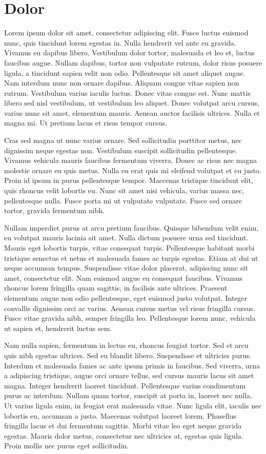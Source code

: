 \chapter{Dolor}

Lorem ipsum dolor sit amet, consectetur adipiscing elit. Fusce luctus
euismod nunc, quis tincidunt lorem egestas in. Nulla hendrerit vel
ante eu gravida. Vivamus eu dapibus libero. Vestibulum dolor tortor,
malesuada et leo et, luctus faucibus augue. Nullam dapibus, tortor non
vulputate rutrum, dolor risus posuere ligula, a tincidunt sapien velit
non odio. Pellentesque sit amet aliquet augue. Nam interdum nunc non
ornare dapibus. Aliquam congue vitae sapien non rutrum. Vestibulum
varius iaculis luctus. Donec vitae congue est. Nunc mattis libero sed
nisl vestibulum, ut vestibulum leo aliquet. Donec volutpat arcu
cursus, varius nunc sit amet, elementum mauris. Aenean auctor
facilisis ultrices. Nulla et magna mi. Ut pretium lacus et risus
tempor cursus.

 Cras sed magna ut nunc varius ornare. Sed sollicitudin porttitor
 metus, nec dignissim neque egestas non. Vestibulum suscipit
 sollicitudin pellentesque. Vivamus vehicula mauris faucibus fermentum
 viverra. Donec ac risus nec magna molestie ornare eu quis metus.
 Nulla eu erat quis mi eleifend volutpat et eu justo. Proin id ipsum
 in purus pellentesque tempor. Maecenas tristique tincidunt elit, quis
 rhoncus velit lobortis eu. Nunc sit amet nisi vehicula, varius massa
 nec, pellentesque nulla. Fusce porta mi ut vulputate vulputate. Fusce
 sed ornare tortor, gravida fermentum nibh.

Nullam imperdiet purus at arcu pretium faucibus. Quisque bibendum
velit enim, eu volutpat mauris lacinia sit amet. Nulla dictum posuere
urna sed tincidunt. Mauris eget lobortis turpis, vitae consequat
turpis. Pellentesque habitant morbi tristique senectus et netus et
malesuada fames ac turpis egestas. Etiam at dui ut neque accumsan
tempus. Suspendisse vitae dolor placerat, adipiscing nunc sit amet,
consectetur elit. Nam euismod augue eu consequat faucibus. Vivamus
rhoncus lorem fringilla quam sagittis, in facilisis ante ultrices.
Praesent elementum augue non odio pellentesque, eget euismod justo
volutpat. Integer convallis dignissim orci ac varius. Aenean cursus
metus vel risus fringilla cursus. Fusce vitae gravida nibh, semper
fringilla leo. Pellentesque lorem nunc, vehicula ut sapien et,
hendrerit luctus sem.

Nam nulla sapien, fermentum in lectus eu, rhoncus feugiat tortor. Sed
et arcu quis nibh egestas ultrices. Sed eu blandit libero. Suspendisse
et ultricies purus. Interdum et malesuada fames ac ante ipsum primis
in faucibus. Sed viverra, urna a adipiscing tristique, augue orci
ornare tellus, sed cursus mauris lacus sit amet magna. Integer
hendrerit laoreet tincidunt. Pellentesque varius condimentum purus ac
interdum. Nullam quam tortor, suscipit at porta in, laoreet nec nulla.
Ut varius ligula enim, in feugiat erat malesuada vitae. Nunc ligula
elit, iaculis nec lobortis eu, accumsan a justo. Maecenas volutpat
laoreet lorem. Phasellus fringilla lacus et dui fermentum sagittis.
Morbi vitae leo eget neque gravida egestas. Mauris dolor metus,
consectetur nec ultricies at, egestas quis ligula. Proin mollis nec
purus eget sollicitudin.

